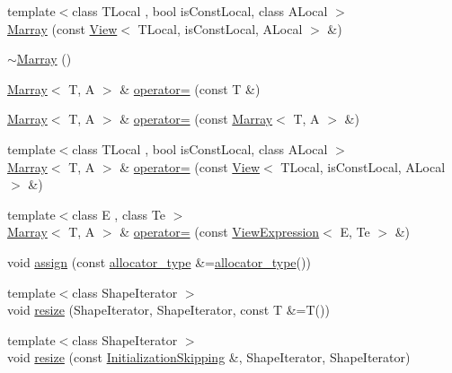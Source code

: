 \begin{DoxyCompactItemize}
\item 
{\footnotesize template$<$class T\+Local , bool is\+Const\+Local, class A\+Local $>$ }\\\hyperlink{classandres_1_1Marray_a0b6a165fd753d5caf8ead55868a856ac}{Marray} (const \hyperlink{classandres_1_1View}{View}$<$ T\+Local, is\+Const\+Local, A\+Local $>$ \&)
\item 
\hyperlink{classandres_1_1Marray_a6b900bedc740214e8b60684a8b0ad621}{$\sim$\+Marray} ()
\item 
\hyperlink{classandres_1_1Marray}{Marray}$<$ T, A $>$ \& \hyperlink{classandres_1_1Marray_a18534988db521fe763e84eef0b3e6c8c}{operator=} (const T \&)
\item 
\hyperlink{classandres_1_1Marray}{Marray}$<$ T, A $>$ \& \hyperlink{classandres_1_1Marray_a7519023d16efb739c0248a84c006e9e6}{operator=} (const \hyperlink{classandres_1_1Marray}{Marray}$<$ T, A $>$ \&)
\item 
{\footnotesize template$<$class T\+Local , bool is\+Const\+Local, class A\+Local $>$ }\\\hyperlink{classandres_1_1Marray}{Marray}$<$ T, A $>$ \& \hyperlink{classandres_1_1Marray_a50c57bb0dbb133dc9e477ec2dbccdad9}{operator=} (const \hyperlink{classandres_1_1View}{View}$<$ T\+Local, is\+Const\+Local, A\+Local $>$ \&)
\item 
{\footnotesize template$<$class E , class Te $>$ }\\\hyperlink{classandres_1_1Marray}{Marray}$<$ T, A $>$ \& \hyperlink{classandres_1_1Marray_a248d8da450653279912cec325a4309d2}{operator=} (const \hyperlink{classandres_1_1ViewExpression}{View\+Expression}$<$ E, Te $>$ \&)
\item 
void \hyperlink{classandres_1_1Marray_a680a02cc61393dddb44fb88e337f29b7}{assign} (const \hyperlink{classandres_1_1Marray_a1e38873cb38bd8568be81bfb804deefd}{allocator\+\_\+type} \&=\hyperlink{classandres_1_1Marray_a1e38873cb38bd8568be81bfb804deefd}{allocator\+\_\+type}())
\item 
{\footnotesize template$<$class Shape\+Iterator $>$ }\\void \hyperlink{classandres_1_1Marray_aa6f53a2bb7002c69146ae9e2e3544ba2}{resize} (Shape\+Iterator, Shape\+Iterator, const T \&=T())
\item 
{\footnotesize template$<$class Shape\+Iterator $>$ }\\void \hyperlink{classandres_1_1Marray_af3b327724eaf79ce9482644f86956a42}{resize} (const \hyperlink{structandres_1_1InitializationSkipping}{Initialization\+Skipping} \&, Shape\+Iterator, Shape\+Iterator)
\end{DoxyCompactItemize}


